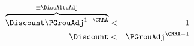 \begin{eqnarray}
\overbrace{\Discount \PGrouAdj^{1-\CRRA} }^{\equiv \DiscAltuAdj} & < & 1 \label{eq:FVAC}
\\ \Discount & < & \PGrouAdj^{\CRRA-1} \notag
\end{eqnarray}
